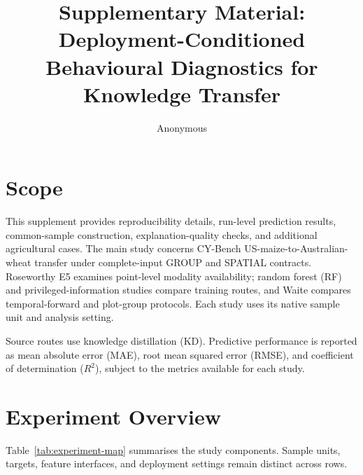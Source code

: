 \documentclass[runningheads]{venue/lncs/llncs}
\title{Supplementary Material: Deployment-Conditioned Behavioural Diagnostics for Knowledge Transfer}
\author{Anonymous}
\institute{Anonymous Institution}
\begin{document}
\maketitle

\section{Scope}

This supplement provides reproducibility details, run-level prediction results, common-sample construction, explanation-quality checks, and additional agricultural cases. The main study concerns CY-Bench US-maize-to-Australian-wheat transfer under complete-input GROUP and SPATIAL contracts. Roseworthy E5 examines point-level modality availability; random forest (RF) and privileged-information studies compare training routes, and Waite compares temporal-forward and plot-group protocols. Each study uses its native sample unit and analysis setting.

Source routes use knowledge distillation (KD). Predictive performance is reported as mean absolute error (MAE), root mean squared error (RMSE), and coefficient of determination ($R^2$), subject to the metrics available for each study.

\section{Experiment Overview}

Table~\ref{tab:experiment-map} summarises the study components. Sample units, targets, feature interfaces, and deployment settings remain distinct across rows.
\end{document}
